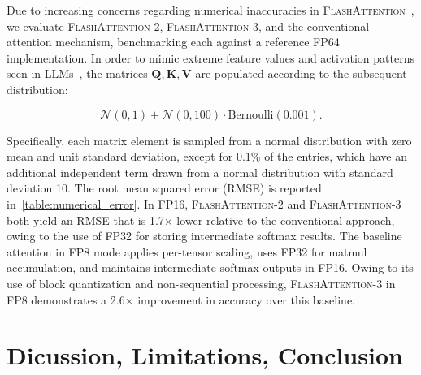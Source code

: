 Due to increasing concerns regarding numerical inaccuracies in \textsc{FlashAttention}~\citep{golden2024flash}, we evaluate \textsc{FlashAttention-2}, \textsc{FlashAttention-3}, and the conventional attention mechanism, benchmarking each against a reference FP64 implementation. In order to mimic extreme feature values and activation patterns seen in LLMs~\citep{dettmers2208llm, sun2024massive}, the matrices $\mathbf{Q}, \mathbf{K}, \mathbf{V}$ are populated according to the subsequent distribution:

\begin{equation*}
  \mathcal{N}(0, 1) + \mathcal{N}(0, 100) \cdot \mathrm{Bernoulli}(0.001).
\end{equation*}

Specifically, each matrix element is sampled from a normal distribution with zero mean and unit standard deviation, except for 0.1\% of the entries, which have an additional independent term drawn from a normal distribution with standard deviation 10. The root mean squared error (RMSE) is reported in~\cref{table:numerical_error}.
In FP16, \textsc{FlashAttention-2} and \textsc{FlashAttention-3} both yield an RMSE that is 1.7$\times$ lower relative to the conventional approach, owing to the use of FP32 for storing intermediate softmax results. The baseline attention in FP8 mode applies per-tensor scaling, uses FP32 for matmul accumulation, and maintains intermediate softmax outputs in FP16. Owing to its use of block quantization and non-sequential processing, \textsc{FlashAttention-3} in FP8 demonstrates a 2.6$\times$ improvement in accuracy over this baseline.

\section{Dicussion, Limitations, Conclusion}
\label{sec:discussion}

